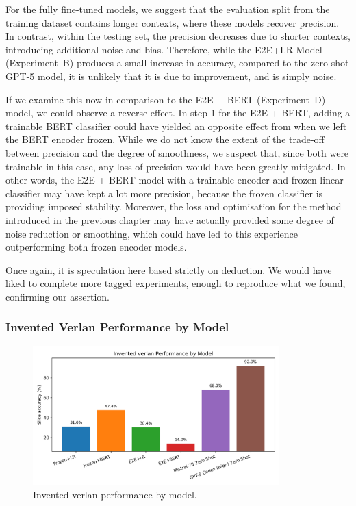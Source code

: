 \documentclass[12pt]{article}
\begin{document}
For the fully fine-tuned models, we suggest that the evaluation split from the training dataset contains longer contexts, where these models recover precision. 
In contrast, within the testing set, the precision decreases due to shorter contexts, introducing additional noise and bias. 
Therefore, while the E2E+LR Model (Experiment~B) produces a small increase in accuracy, compared to the zero-shot GPT-5 model, it is unlikely that it is due to improvement, and is simply noise.

If we examine this now in comparison to the E2E + BERT (Experiment~D) model, we could observe a reverse effect. In step 1 for the E2E + BERT, adding a trainable BERT classifier could have yielded an opposite effect from when we left the BERT encoder frozen. While we do not know the extent of the trade-off between precision and the degree of smoothness, we suspect that, since both were trainable in this case, any loss of precision would have been greatly mitigated. In other words, the E2E + BERT model with a trainable encoder and frozen linear classifier may have kept a lot more precision, because the frozen classifier is providing imposed stability. Moreover, the loss and optimisation for the method introduced in the previous chapter may have actually provided some degree of noise reduction or smoothing, which could have led to this experience outperforming both frozen encoder models.

Once again, it is speculation here based strictly on deduction. We would have liked to complete more tagged experiments, enough to reproduce what we found, confirming our assertion.

\subsubsection{Invented Verlan Performance by Model}

\begin{figure}[htbp]
    \centering
    \includegraphics[width=0.85\textwidth]{figures/invented_verlan_comparison.png}
    \caption{Invented verlan performance by model.}
    \label{fig:invented-verlan-comparison}
\end{figure}
\end{document}

